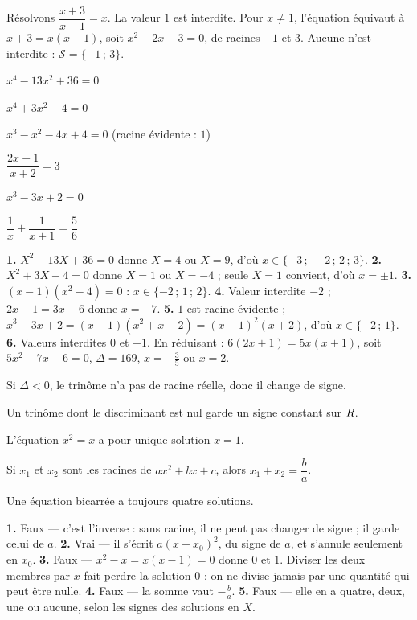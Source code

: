 \begin{exemple}
Résolvons $\dfrac{x+3}{x-1} = x$. La valeur $1$ est interdite. Pour
$x \neq 1$, l'équation équivaut à $x+3 = x(x-1)$, soit $x^{2}-2x-3 = 0$, de
racines $-1$ et $3$. Aucune n'est interdite :
$\mathcal S = \{-1\,;\,3\}$.
\end{exemple}

\begin{entrainement}
\exo[\niveau{1}] $x^{4}-13x^{2}+36 = 0$

\exo[\niveau{2}] $x^{4}+3x^{2}-4 = 0$

\exo[\niveau{2}] $x^{3}-x^{2}-4x+4 = 0$ (racine évidente : $1$)

\exo[\niveau{2}] $\dfrac{2x-1}{x+2} = 3$

\exo[\niveau{3}] $x^{3}-3x+2 = 0$

\exo[\niveau{3}] $\dfrac{1}{x}+\dfrac{1}{x+1} = \dfrac{5}{6}$
\end{entrainement}

\begin{corrige}
\textbf{1.} $X^{2}-13X+36 = 0$ donne $X = 4$ ou $X = 9$, d'où
$x \in \{-3\,;\,-2\,;\,2\,;\,3\}$.
\textbf{2.} $X^{2}+3X-4 = 0$ donne $X = 1$ ou $X = -4$ ; seule $X = 1$
convient, d'où $x = \pm1$.
\textbf{3.} $(x-1)(x^{2}-4) = 0$ : $x \in \{-2\,;\,1\,;\,2\}$.
\textbf{4.} Valeur interdite $-2$ ; $2x-1 = 3x+6$ donne $x = -7$.
\textbf{5.} $1$ est racine évidente ; $x^{3}-3x+2 = (x-1)(x^{2}+x-2)
= (x-1)^{2}(x+2)$, d'où $x \in \{-2\,;\,1\}$.
\textbf{6.} Valeurs interdites $0$ et $-1$. En réduisant :
$6(2x+1) = 5x(x+1)$, soit $5x^{2}-7x-6 = 0$, $\Delta = 169$,
$x = -\frac35$ ou $x = 2$.
\end{corrige}

\begin{vraifaux}
\exo Si $\Delta < 0$, le trinôme n'a pas de racine réelle, donc il change de
signe.

\exo Un trinôme dont le discriminant est nul garde un signe constant sur
$R$.

\exo L'équation $x^{2} = x$ a pour unique solution $x = 1$.

\exo Si $x_{1}$ et $x_{2}$ sont les racines de $ax^{2}+bx+c$, alors
$x_{1}+x_{2} = \dfrac ba$.

\exo Une équation bicarrée a toujours quatre solutions.
\end{vraifaux}

\begin{corrige}
\textbf{1.} Faux — c'est l'inverse : sans racine, il ne peut pas changer de
signe ; il garde celui de $a$.
\textbf{2.} Vrai — il s'écrit $a(x-x_{0})^{2}$, du signe de $a$, et s'annule
seulement en $x_{0}$.
\textbf{3.} Faux — $x^{2}-x = x(x-1) = 0$ donne $0$ et $1$. Diviser les deux
membres par $x$ fait perdre la solution $0$ : on ne divise jamais par une
quantité qui peut être nulle.
\textbf{4.} Faux — la somme vaut $-\frac ba$.
\textbf{5.} Faux — elle en a quatre, deux, une ou aucune, selon les signes
des solutions en $X$.
\end{corrige}

